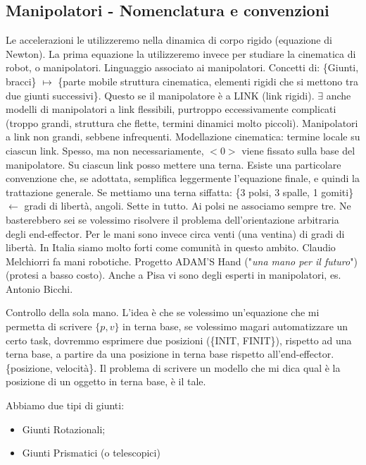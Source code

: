 \subsection{Manipolatori - Nomenclatura e convenzioni}

Le accelerazioni le utilizzeremo nella dinamica di corpo rigido (equazione di Newton). La prima equazione la utilizzeremo invece per studiare la cinematica di robot, o manipolatori. Linguaggio associato ai manipolatori. Concetti di: \{Giunti, bracci\} $\mapsto$ \{parte mobile struttura cinematica, elementi rigidi che si mettono tra due giunti successivi\}. Questo se il manipolatore è a LINK (link rigidi). $\exists$ anche modelli di manipolatori a link flessibili, purtroppo eccessivamente complicati (troppo grandi, struttura che flette, termini dinamici molto piccoli). Manipolatori a link non grandi, sebbene infrequenti. Modellazione cinematica: termine locale su ciascun link. Spesso, ma non necessariamente, $<0>$ viene fissato sulla base del manipolatore. Su ciascun link posso mettere una terna. Esiste una particolare convenzione che, se adottata, semplifica leggermente l'equazione finale, e quindi la trattazione generale. Se mettiamo una terna siffatta: \{3 polsi, 3 spalle, 1 gomiti\} $\leftarrow$ gradi di libertà, angoli. Sette in tutto. Ai polsi ne associamo sempre tre. Ne basterebbero sei se volessimo risolvere il problema dell'orientazione arbitraria degli end-effector. Per le mani sono invece circa venti (una ventina) di gradi di libertà. In Italia siamo molto forti come comunità in questo ambito. Claudio Melchiorri fa mani robotiche. Progetto ADAM'S Hand ("\textit{una mano per il futuro}") (protesi a basso costo). Anche a Pisa vi sono degli esperti in manipolatori, es. Antonio Bicchi.

Controllo della sola mano. L'idea è che se volessimo un'equazione che mi permetta di scrivere $\{p,v\}$ in terna base, se volessimo magari automatizzare un certo task, dovremmo esprimere due posizioni (\{INIT, FINIT\}), rispetto ad una terna base, a partire da una posizione in terna base rispetto all'end-effector. \{posizione, velocità\}. Il problema di scrivere un modello che mi dica qual è la posizione di un oggetto in terna base, è il tale.

Abbiamo due tipi di giunti:

\begin{itemize}

\item Giunti Rotazionali;
\item Giunti Prismatici (o telescopici)
\end{itemize}

